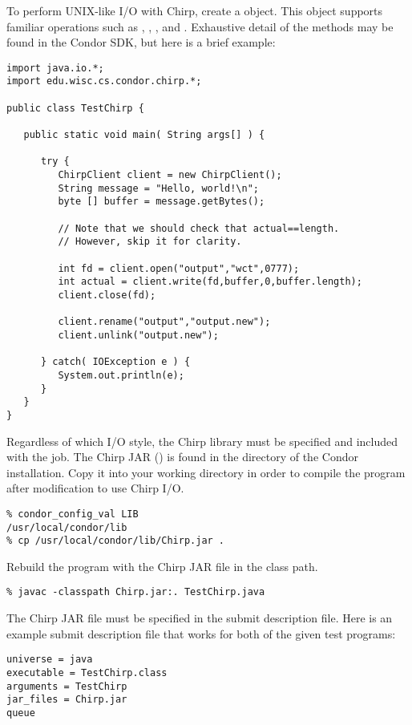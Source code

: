 To perform UNIX-like I/O with Chirp,
create a  object.
This object supports familiar operations such as , ,
, and .
Exhaustive detail of the methods may be found in the Condor 
SDK, but here is a brief example:

\begin{verbatim}
import java.io.*;
import edu.wisc.cs.condor.chirp.*;

public class TestChirp {

   public static void main( String args[] ) {

      try {
         ChirpClient client = new ChirpClient();
         String message = "Hello, world!\n";
         byte [] buffer = message.getBytes();

         // Note that we should check that actual==length.
         // However, skip it for clarity.

         int fd = client.open("output","wct",0777);
         int actual = client.write(fd,buffer,0,buffer.length);
         client.close(fd);

         client.rename("output","output.new");
         client.unlink("output.new");

      } catch( IOException e ) {
         System.out.println(e);
      }
   }
}
\end{verbatim}

Regardless of which I/O style, 
the Chirp library must be specified and included with the job.
The Chirp JAR ()
is found in the  directory of the Condor installation.
Copy it into your working directory in order to
compile the program after modification to use Chirp I/O.

\begin{verbatim}
% condor_config_val LIB
/usr/local/condor/lib
% cp /usr/local/condor/lib/Chirp.jar .
\end{verbatim}

Rebuild the program with the Chirp JAR file in the class path.

\begin{verbatim}
% javac -classpath Chirp.jar:. TestChirp.java
\end{verbatim}

The Chirp JAR file must be specified in the submit description file.
Here is an example submit description file that works for both
of the given test programs:

\begin{verbatim}
universe = java
executable = TestChirp.class
arguments = TestChirp
jar_files = Chirp.jar
queue
\end{verbatim}
